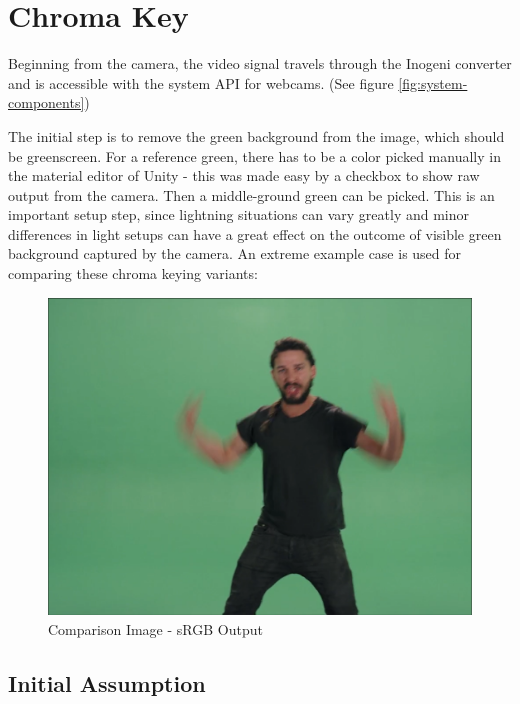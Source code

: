 \section{Chroma Key}

Beginning from the camera, the video signal travels through the Inogeni 
converter and is accessible with the system API for webcams. 
(See figure \ref{fig:system-components})

The initial step is to remove the green background from the image, which should 
be greenscreen. For a reference green, there has to be a color picked 
manually in the material editor of Unity - this was made easy by a checkbox to 
show raw output from the camera. Then a middle-ground green can be 
picked. This is an important setup step, since lightning situations can vary 
greatly and minor differences in light setups can have a great effect on the 
outcome of visible green background captured by the camera.
\newline
An extreme example case is used for comparing these chroma keying variants:

\begin{figure}[htb]
	\includegraphics[width=\textwidth]{_raw_resources/Comparison_Example.png}
	\caption{Comparison Image\cite{vimeo:shia:2015} - sRGB Output}
	\label{fig:chroma:color}
\end{figure}

\subsection{Initial Assumption}

